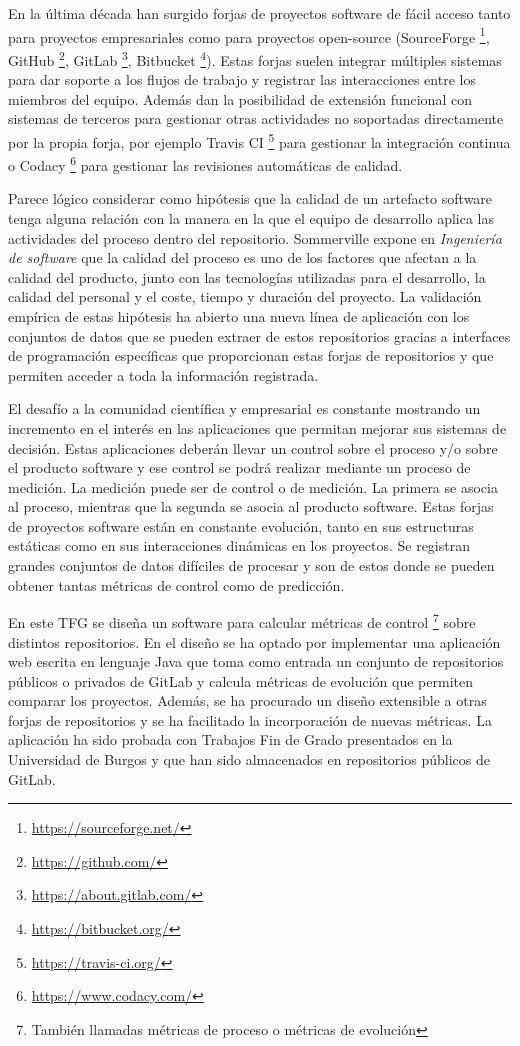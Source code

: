 En la última década han surgido forjas de proyectos software de fácil acceso tanto para proyectos empresariales como para proyectos open-source (SourceForge \footnote{\url{https://sourceforge.net/}}, GitHub \footnote{\url{https://github.com/}}, GitLab \footnote{\url{https://about.gitlab.com/}}, Bitbucket  \footnote{\url{https://bitbucket.org/}}).  Estas forjas suelen integrar múltiples sistemas para dar soporte a los flujos de trabajo y registrar las interacciones entre los miembros del equipo. Además dan la posibilidad de extensión funcional con sistemas de terceros para gestionar otras actividades no soportadas directamente por la propia forja, por ejemplo Travis CI \footnote{\url{https://travis-ci.org/}} para gestionar la integración continua o Codacy \footnote{\url{https://www.codacy.com/}} para gestionar las revisiones automáticas de calidad. 

Parece lógico considerar como hipótesis que la calidad de un artefacto software tenga alguna relación con la manera en la que el equipo de desarrollo aplica las actividades del proceso dentro del repositorio. Sommerville expone en \textit{Ingeniería de software} \cite{sommerville_ingenierisoftware_2002} que la calidad del proceso es uno de los factores que afectan a la calidad del producto, junto con las tecnologías utilizadas para el desarrollo, la calidad del personal y el coste, tiempo y duración del proyecto. La validación empírica de estas  hipótesis ha abierto una nueva línea de aplicación con los conjuntos de datos que se pueden extraer de estos repositorios gracias a interfaces de programación específicas que proporcionan estas forjas de repositorios y que permiten acceder a toda la información registrada.

El  desafío a la comunidad científica y empresarial es constante mostrando un incremento en el interés en las aplicaciones que permitan mejorar sus sistemas de decisión. Estas aplicaciones deberán llevar un control sobre el proceso y/o sobre el producto software y ese control se podrá realizar mediante un proceso de medición. La medición puede ser de control o de medición. La primera se asocia al proceso, mientras que la segunda se asocia al producto software. Estas forjas de proyectos software están en constante evolución, tanto en sus estructuras estáticas como en sus interacciones dinámicas en los proyectos. Se registran grandes conjuntos de datos difíciles de procesar y son de estos donde se pueden obtener tantas métricas de control como de predicción.

En este TFG se diseña un software para calcular métricas de control \footnote{También llamadas métricas de proceso o métricas de evolución} sobre distintos repositorios. En el diseño se ha optado por implementar una aplicación web escrita en lenguaje Java que toma como entrada un conjunto de repositorios públicos o privados de GitLab y calcula métricas de evolución que permiten comparar los proyectos. Además, se ha procurado un diseño extensible a otras forjas de repositorios y se ha facilitado la incorporación de nuevas métricas. La aplicación ha sido probada con Trabajos Fin de Grado presentados en la Universidad de Burgos y que han sido almacenados en repositorios públicos de GitLab.

